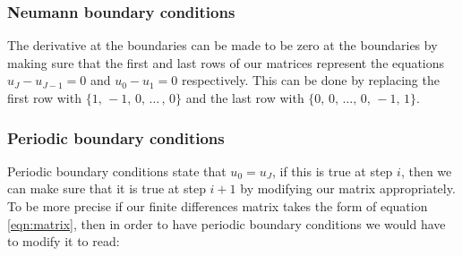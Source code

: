 \subsubsection{Neumann boundary conditions}
The derivative at the boundaries can be made to be zero at the boundaries by making sure that the first and last rows of our matrices represent the equations $u_J - u_{J-1} = 0$ and $u_0 - u_1 = 0$ respectively. This can be done by replacing the first row with $\{ 1, \, -1, \, 0, \, \dots \, , \, 0 \}$ and the last row with $\{0, \, 0, \, \dots, \, 0, \, -1, \, 1 \}$.

\subsubsection{Periodic boundary conditions}
Periodic boundary conditions state that $u_0 = u_J$, if this is true at step $i$, then we can make sure that it is true at step $i+1$ by modifying our matrix appropriately. To be more precise if our finite differences matrix takes the form of equation \ref{eqn:matrix}, then in order to have periodic boundary conditions we would have to modify it to read:


